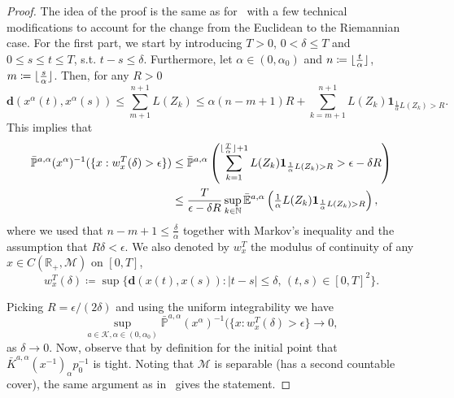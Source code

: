 \documentclass{article}
\newcommand{\CM}{\mathcal{M}}
\newcommand{\BR}{\mathbb{R}}
\newcommand{\BN}{\mathbb{N}}
\newcommand{\bd}{\mathbf{d}}
\DeclarePairedDelimiter\floor{\lfloor}{\rfloor}
\begin{document}
\begin{proof}
The idea of the proof is the same as for~\cite[Lemma 6.2]{bianchi2019constant} with a few technical modifications to account for the change from the Euclidean to the Riemannian case. For the  first part, we start by introducing $T>0$, $0<\delta\leq T$ and $0\leq s\leq t\leq T$, s.t. $t-s\leq \delta$. Furthermore, let $\alpha\in(0,\alpha_0)$ and $n\coloneqq \floor{\frac{t}{\alpha}}$, $m\coloneqq \floor{\frac{s}{\alpha}}$. Then, for any $R>0$
\begin{equation}
    \bd\left(x^\alpha(t),x^\alpha(s)\right)\leq \sum_{m+1}^{n+1}L(Z_k)\leq \alpha(n-m+1)R+\sum_{k=m+1}^{n+1}L(Z_k)\mathbf{1}_{\frac{1}{\alpha}L(Z_k)>R}.
\end{equation}
This implies that
\begin{equation}
    \begin{aligned}
        \bar{\mathbb{P}}^{a,\alpha}(x^\alpha)^{-1}(\{x:w_x^T(\delta)>\epsilon\})&\leq \bar{\mathbb{P}}^{a,\alpha}\left( \sum_{k=1}^{\floor{\frac{T}{\alpha}}+1}L(Z_k)\mathbf{1}_{\frac{1}{\alpha}L(Z_k)>R}>\epsilon-\delta R\right)\\
        &\leq \frac{T}{\epsilon-\delta R}\sup_{k\in\BN}\bar{\mathbb{E}}^{a,\alpha}\left(\tfrac{1}{\alpha}L(Z_k)\mathbf{1}_{\frac{1}{\alpha}L(Z_k)>R}\right),
    \end{aligned}
\end{equation}
where we used that $n-m+1\leq \tfrac{\delta}{\alpha}$ together with Markov's inequality and the assumption that $R\delta<\epsilon$. We also denoted by $w_x^T$ the modulus of continuity of any $x\in C(\BR_+,\CM)$ on $[0,T]$,
\begin{equation}
    w_x^T(\delta)\coloneqq \sup\{\bd(x(t),x(s)):|t-s|\leq \delta,\, (t,s)\in[0,T]^2\}.
\end{equation}

Picking $R=\epsilon/(2\delta)$ and using the uniform integrability we have
\begin{equation}
    \sup_{a\in\mathcal{K},\alpha\in(0,\alpha_0)}\bar{\mathbb{P}}^{a,\alpha}(x^{\alpha})^{-1}(\{x:w_x^T(\delta)>\epsilon\}\to 0,
\end{equation}
as $\delta\to 0$. Now, observe that by definition for the initial point that $\bar{K}^{a,\alpha}(x^{-1})_{\alpha}p_0^{-1}$ is tight. Noting that $\mathcal{M}$ is separable (has a second countable cover), the same argument as in~\cite[Theorem 7.3]{billingsley2013convergence} gives the statement. 






\end{proof}
\end{document}
